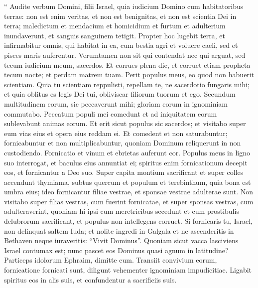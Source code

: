 \begin{biblechapter}
\begin{biblechapter}
\begin{biblechapter}
\begin{biblechapter}
 \verse “ Audite verbum Domini,
 filii Israel,
 quia iudicium Domino
 cum habitatoribus terrae:
 non est enim veritas, et non est benignitas,
 et non est scientia Dei in terra;
 \verse maledictum et mendacium
 et homicidium et furtum et adulterium inundaverunt,
 et sanguis sanguinem tetigit.
 \verse Propter hoc lugebit terra,
 et infirmabitur omnis, qui habitat in ea,
 cum bestia agri et volucre caeli,
 sed et pisces maris auferentur.
 \verse Verumtamen non sit qui contendat
 nec qui arguat,
 sed tecum iudicium meum, sacerdos.
 \verse Et corrues plena die,
 et corruet etiam propheta tecum nocte;
 et perdam matrem tuam.
 \verse Perit populus meus,
 eo quod non habuerit scientiam.
 Quia tu scientiam reppulisti,
 repellam te, ne sacerdotio fungaris mihi;
 et quia oblitus es legis Dei tui,
 obliviscar filiorum tuorum et ego.
 \verse Secundum multitudinem eorum, sic peccaverunt mihi;
 gloriam eorum in ignominiam commutabo.
 \verse Peccatum populi mei comedunt
 et ad iniquitatem eorum sublevabunt animas eorum.
 \verse Et erit sicut populus sic sacerdos;
 et visitabo super eum vias eius
 et opera eius reddam ei.
 \verse Et comedent et non saturabuntur;
 fornicabuntur et non multiplicabuntur,
 quoniam Dominum reliquerunt
 in non custodiendo.
 \verse Fornicatio et vinum et ebrietas auferunt cor.
 \verse Populus meus in ligno suo interrogat,
 et baculus eius annuntiat ei;
 spiritus enim fornicationum decepit eos,
 et fornicantur a Deo suo.
 \verse Super capita montium sacrificant
 et super colles accendunt thymiama,
 subtus quercum et populum et terebinthum,
 quia bona est umbra eius;
 ideo fornicantur filiae vestrae,
 et sponsae vestrae adulterae sunt.
 \verse Non visitabo super filias vestras,
 cum fuerint fornicatae,
 et super sponsas vestras,
 cum adulteraverint,
 quoniam hi ipsi cum meretricibus secedunt
 et cum prostibulis delubrorum sacrificant,
 et populus non intellegens corruet.
 \verse Si fornicaris tu, Israel,
 non delinquat saltem Iuda;
 et nolite ingredi in Galgala
 et ne ascenderitis in Bethaven
 neque iuraveritis: “Vivit Dominus”.
 \verse Quoniam sicut vacca lasciviens
 Israel contumax est;
 nunc pascet eos Dominus
 quasi agnum in latitudine?
 \verse Particeps idolorum Ephraim,
 dimitte eum.
 \verse Transiit convivium eorum,
 fornicatione fornicati sunt,
 diligunt vehementer
 ignominiam impudicitiae.
 \verse Ligabit spiritus eos in alis suis,
 et confundentur a sacrificiis suis.
 

\end{biblechapter}
\end{biblechapter}
\end{biblechapter}
\end{biblechapter}
